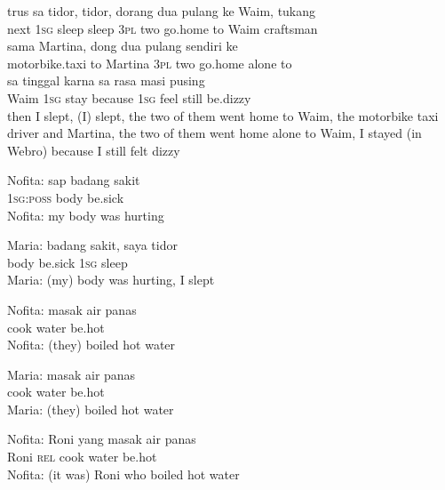 \ea
\gll   trus    {sa}    {tidor,}    {tidor,}    {dorang}    {dua}    {pulang}    {ke}    {Waim,}    {tukang}\\
  next    {\textsc{1sg}}    {sleep}    {sleep}    {\textsc{3pl}}    {two}    {go.home}    {to}    {Waim}    {craftsman}\\
    {sama}    {Martina,}    {dong}    {dua}    {pulang}    {sendiri}   ke\\
   {motorbike.taxi}    {to}    {Martina}    {\textsc{3pl}}    {two}    {go.home}    {alone}   to\\
    {sa}    {tinggal}    {karna}    {sa}    {rasa}    {masi}    {pusing}\\
   {Waim}    {\textsc{1sg}}    {stay}    {because}    {\textsc{1sg}}    {feel}    {still}    {be.dizzy}\\
\glt
then I slept, (I) slept, the two of them went home to Waim, the motorbike taxi driver and Martina, the two of them went home alone to Waim, I stayed (in Webro) because I still felt dizzy
\z

\ea
\gll   Nofita:   sap   badang   sakit\\
{}  \textsc{1sg}:\textsc{poss}   body   be.sick\\
\glt
Nofita: my body was hurting
\z

\ea
\gll   Maria:   badang   sakit,   saya   tidor\\
 {} body   be.sick   \textsc{1sg}   sleep\\
\glt
Maria: (my) body was hurting, I slept
\z

\ea
\gll   Nofita:   masak   air   panas\\
{}    cook   water   be.hot\\
\glt
Nofita: (they) boiled hot water
\z

\ea
\gll   Maria:   masak   air   panas\\
 {}     cook   water   be.hot\\
\glt
Maria: (they) boiled hot water
\z

\ea
\gll   Nofita:   Roni   yang   masak   air   panas\\
  {}   Roni   \textsc{rel}   cook   water   be.hot\\
\glt
Nofita: (it was) Roni who boiled hot water
\z

